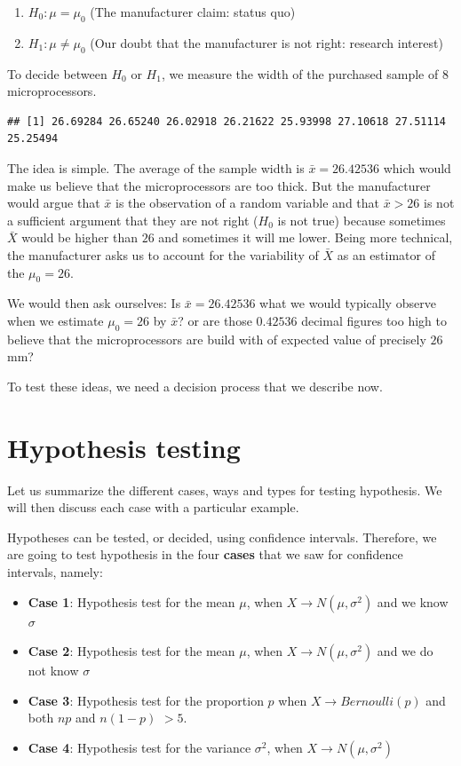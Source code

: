 \documentclass[
]{book}
\providecommand{\tightlist}{%
  \setlength{\itemsep}{0pt}\setlength{\parskip}{0pt}}
\begin{document}
\begin{enumerate}
\def\labelenumi{\alph{enumi}.}
\tightlist
\item
  \(H_0:\mu = \mu_0\) (The manufacturer claim: status quo)
\item
  \(H_1:\mu \neq \mu_0\) (Our doubt that the manufacturer is not right: research interest)
\end{enumerate}

To decide between \(H_0\) or \(H_1\), we measure the width of the purchased sample of \(8\) microprocessors.

\begin{verbatim}
## [1] 26.69284 26.65240 26.02918 26.21622 25.93998 27.10618 27.51114 25.25494
\end{verbatim}

The idea is simple. The average of the sample width is \(\bar{x}=26.42536\) which would make us believe that the microprocessors are too thick. But the manufacturer would argue that \(\bar{x}\) is the observation of a random variable and that \(\bar{x}>26\) is not a sufficient argument that they are not right (\(H_0\) is not true) because sometimes \(\bar{X}\) would be higher than \(26\) and sometimes it will me lower. Being more technical, the manufacturer asks us to account for the variability of \(\bar{X}\) as an estimator of the \(\mu_0=26\).

We would then ask ourselves: Is \(\bar{x}=26.42536\) what we would typically observe when we estimate \(\mu_0=26\) by \(\bar{x}\)? or are those \(0.42536\) decimal figures too high to believe that the microprocessors are build with of expected value of precisely \(26\)mm?

To test these ideas, we need a decision process that we describe now.

\hypertarget{hypothesis-testing-1}{%
\section{Hypothesis testing}\label{hypothesis-testing-1}}

Let us summarize the different cases, ways and types for testing hypothesis. We will then discuss each case with a particular example.

Hypotheses can be tested, or decided, using confidence intervals. Therefore, we are going to test hypothesis in the four \textbf{cases} that we saw for confidence intervals, namely:

\begin{itemize}
\item
  \textbf{Case 1}: Hypothesis test for the mean \(\mu\), when \(X \rightarrow N(\mu, \sigma^2)\) and we know \(\sigma\)
\item
  \textbf{Case 2}: Hypothesis test for the mean \(\mu\), when \(X \rightarrow N(\mu, \sigma^2)\) and we do not know \(\sigma\)
\item
  \textbf{Case 3}: Hypothesis test for the proportion \(p\) when \(X \rightarrow Bernoulli(p)\) and both \(np\) and \(n(1-p)\) \(> 5\).
\item
  \textbf{Case 4}: Hypothesis test for the variance \(\sigma^2\), when \(X \rightarrow N(\mu, \sigma^2)\)
\end{itemize}
\end{document}
